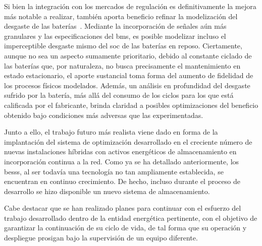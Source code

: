 Si bien la integración con los mercados de regulación es definitivamente la mejora más notable a realizar, también aporta beneficio refinar la modelización del desgaste de las baterías~\cite{shamarova2022review}. Mediante la incorporación de señales aún más granulares y las especificaciones del \gls{bms}, es posible modelizar incluso el imperceptible desgaste mismo del \gls{soc} de las baterías en reposo. Ciertamente, aunque no sea un aspecto sumamente prioritario, debido al constante ciclado de las baterías que, por naturaleza, no busca precisamente el mantenimiento en estado estacionario, el aporte sustancial toma forma del aumento de fidelidad de los procesos físicos modelados. Además, un análisis en profundidad del desgaste sufrido por la batería, más allá del consumo de los ciclos para los que está calificada por el fabricante, brinda claridad a posibles optimizaciones del beneficio obtenido bajo condiciones más adversas que las experimentadas.

Junto a ello, el trabajo futuro más realista viene dado en forma de la implantación del sistema de optimización desarrollado en el creciente número de nuevas instalaciones híbridas con activos energéticos de almacenamiento en incorporación continua a la red. Como ya se ha detallado anteriormente, los \glspl{bess}, al ser todavía una tecnología no tan ampliamente establecida, se encuentran en continuo crecimiento. De hecho, incluso durante el proceso de desarrollo se hizo disponible un nuevo sistema de almacenamiento.

Cabe destacar que se han realizado planes para continuar con el esfuerzo del trabajo desarrollado dentro de la entidad energética pertinente, con el objetivo de garantizar la continuación de su ciclo de vida, de tal forma que su operación y despliegue prosigan bajo la supervisión de un equipo diferente.
